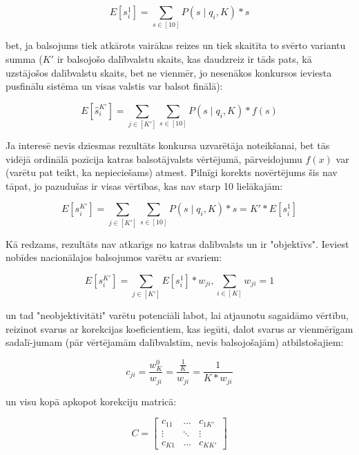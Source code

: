 \documentclass[12pt, a4paper]{article}
\begin{document}
\begin{equation}
    E[s_i^1] = \sum_{s\in[10]}P(s\mid q_i, K)*s
\end{equation}

bet, ja balsojums tiek atkārots vairākas reizes un tiek skaitīta to svērto variantu summa ($K'$ ir balsojošo dalībvalstu skaits, kas daudzreiz ir tāds pats, kā uzstājošos dalībvalstu skaits, bet ne vienmēr, jo nesenākos konkursos ieviesta pusfinālu sistēma un visas valstis var balsot finālā):

\begin{equation}
    E[\hat s_i^{K'}] = \sum_{j\in [K']}\sum_{s\in[10]}P(s\mid q_i, K)*f(s)
\end{equation}

Ja interesē nevis dziesmas rezultāts konkursa uzvarētāja noteikšanai, bet tās vidējā ordinālā pozīcija katras balsotājvalsts vērtējumā, pārveidojumu $f(x)$ var (varētu pat teikt, ka nepieciešams) atmest. Pilnīgi korekts novērtējums šis nav tāpat, jo pazudušas ir visas vērtības, kas nav starp 10 lielākajām:

\begin{equation}
    E[s_i^{K'}] = \sum_{j\in [K']}\sum_{s\in[10]}P(s\mid q_i, K)*s = K'*E[s_i^1]
\end{equation}

Kā redzams, rezultāts nav atkarīgs no katras dalībvalsts un ir "objektīvs". Ieviest nobīdes nacionālajos balsojumos varētu ar svariem:

\begin{equation}
    E[s_i^{K'}] = \sum_{j\in [K']}E[s_i^{1}]*w_{ji}, \sum_{i\in[K]} w_{ji} = 1
\end{equation}

un tad "neobjektivitāti" varētu potenciāli labot, lai atjaunotu sagaidāmo vērtību, reizinot svarus ar korekcijas koeficientiem, kas iegūti, dalot svarus ar vienmērīgam sadalī-jumam (pār vērtējamām dalībvalstīm, nevis balsojošajām) atbilstošajiem:

\begin{equation}
    c_{ji}=\frac{w_{K}^0}{w_{ji}}=\frac{\frac{1}{K}}{w_{ji}}=\frac{1}{K*w_{ji}}
\end{equation}

un visu kopā apkopot korekciju matricā:

\begin{equation}
    C=
    \begin{bmatrix}
        c_{11} &  ... & c_{1K'} \\
        \vdots & \ddots & \vdots \\
        c_{K1} &  ... & c_{KK'} 
    \end{bmatrix}
\end{equation}
\end{document}
